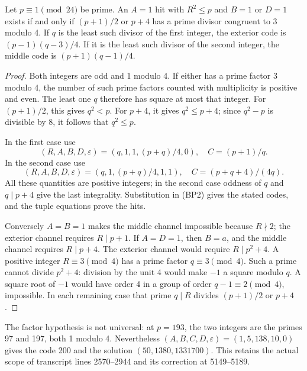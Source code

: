 \begin{theorem}\label{thm:bp-endpoint}
Let \(p\equiv1\pmod{24}\) be prime. An \(A=1\) hit with
\(R^2\le p\) and \(B=1\) or \(D=1\) exists if and only if
\((p+1)/2\) or \(p+4\) has a prime divisor congruent to 3 modulo 4.
If \(q\) is the least such divisor of the first integer, the
exterior code is \((p-1)(q-3)/4\). If it is the least such divisor
of the second integer, the middle code is \((p+1)(q-1)/4\).
\end{theorem}
\begin{proof}
Both integers are odd and 1 modulo 4. If either has a prime factor
3 modulo 4, the number of such prime factors counted with multiplicity
is positive and even. The least one \(q\) therefore has square at
most that integer. For \((p+1)/2\), this gives \(q^2<p\).
For \(p+4\), it gives \(q^2\le p+4\); since \(q^2-p\)
is divisible by 8, it follows that \(q^2\le p\).

In the first case use
\[
 (R,A,B,D,\varepsilon)=
 (q,1,1,(p+q)/4,0),\quad C=(p+1)/q.
\]
In the second case use
\[
 (R,A,B,D,\varepsilon)=
 (q,1,(p+q)/4,1,1),\quad C=(p+q+4)/(4q).
\]
All these quantities are positive integers; in the second case oddness
of \(q\) and \(q\mid p+4\) give the last integrality. Substitution
in (BP2) gives the stated codes, and the tuple equations prove the hits.

Conversely \(A=B=1\) makes the middle channel impossible because
\(R\nmid2\); the exterior channel requires \(R\mid p+1\).
If \(A=D=1\), then \(B=a\), and the middle channel requires
\(R\mid p+4\). The exterior channel would require
\(R\mid p^2+4\). A positive integer \(R\equiv3\pmod4\)
has a prime factor \(q\equiv3\pmod4\). Such a prime cannot divide
\(p^2+4\): division by the unit 4 would make \(-1\) a square
modulo \(q\). A square root of \(-1\) would have order 4 in a
group of order \(q-1\equiv2\pmod4\), impossible. In each remaining
case that prime \(q\mid R\) divides \((p+1)/2\) or \(p+4\).
\end{proof}

The factor hypothesis is not universal: at \(p=193\), the two
integers are the primes 97 and 197, both 1 modulo 4. Nevertheless
\((A,B,C,D,\varepsilon)=(1,5,138,10,0)\) gives the code 200 and
the solution \((50,1380,1331700)\). This retains the actual scope of
transcript lines 2570--2944 and its correction at 5149--5189.

